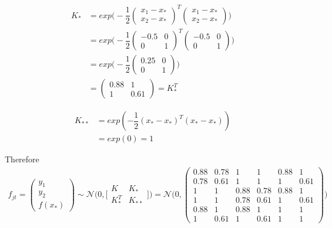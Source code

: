 \documentclass[11pt]{article}
\begin{document}
\begin{align*}
	K_* &= exp\big(-\dfrac{1}{2}
	\begin{pmatrix}
		x_1 - x_* \\
		x_2 - x_*
	\end{pmatrix}^T 
	\begin{pmatrix}
		x_1 - x_* \\
		x_2 - x_*
	\end{pmatrix}
	\big)\\	
	&= exp\big(-\dfrac{1}{2}
	\begin{pmatrix}
		-0.5 & 0\\
		0 & 1
	\end{pmatrix}^T 
	\begin{pmatrix}
		-0.5 & 0\\
		0 & 1
	\end{pmatrix}
	\big)\\	
	&= exp\big(-\dfrac{1}{2}
	\begin{pmatrix}
		0.25 & 0 \\
		0 & 1
	\end{pmatrix}
	\big)\\	
	&=
	\begin{pmatrix}
		0.88 & 1 \\
		1 & 0.61
	\end{pmatrix} = K^T_*
\end{align*}

\begin{align*}
	K_{**} &= exp(-\dfrac{1}{2} (x_* - x_*)^T (x_* - x_*)) \\
		   &= exp(0) = 1
\end{align*}

Therefore
\begin{align*}
	f_{jt} =
	\begin{pmatrix}
		y_1\\
		y_2\\
		f(x_*)
	\end{pmatrix}
	\sim \mathcal N \Big(0, \Big[
	\begin{matrix}
	K & K_* \\
	K^T_* & K_{**}
	\end{matrix}
	\Big]\Big)
	= \mathcal N \Big(0,
	\begin{pmatrix}
		0.88 & 0.78 & 1	& 1	& 0.88 & 1\\
		0.78 & 0.61 & 1 & 1 & 1 & 0.61\\
		1 & 1 & 0.88 & 0.78 & 0.88 & 1\\
		1 & 1 & 0.78 & 0.61 & 1 & 0.61\\
		0.88 & 1 & 0.88 & 1 & 1 & 1\\
		1 & 0.61 & 1 & 0.61 & 1 & 1
	\end{pmatrix}
	\Big)\\
\end{align*}
\end{document}
